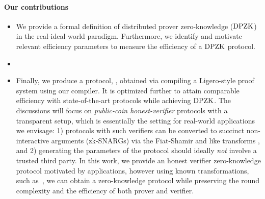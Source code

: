 \paragraph*{Our contributions}
\begin{itemize}
	\item We provide a formal definition of distributed prover zero-knowledge ($\text{DPZK}$) in the real-ideal world paradigm. Furthermore, we identify and motivate relevant efficiency parameters to measure the efficiency of a $\text{DPZK}$ protocol. %
	\item {}
	\item Finally, we produce a protocol, \name, obtained via compiling a Ligero-style proof system using our compiler. It is optimized further to attain comparable efficiency with state-of-the-art protocols while achieving $\text{DPZK}$.
	The discussions will focus on {\em public-coin honest-verifier} protocols with a transparent setup, which is essentially the setting for real-world applications we envisage: 1) protocols with such verifiers can be converted to succinct non-interactive arguments (zk-SNARGs) via the Fiat-Shamir and like transforms \cite{FS86, BCS16}, and 2) generating the parameters of the protocol should ideally {\em not} involve a trusted third party. In this work, we provide an honest verifier zero-knowledge protocol motivated by applications, however using known transformations, such as~\cite{hubavcek2018efficiency}, we can obtain a zero-knowledge protocol while preserving the round complexity and the efficiency of both prover and verifier.
\end{itemize}
